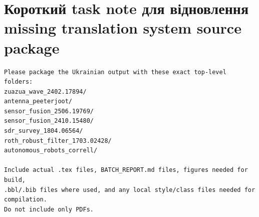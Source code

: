 \section{Короткий task note для відновлення missing translation system source package}

\begin{lstlisting}
Please package the Ukrainian output with these exact top-level folders:
zuazua_wave_2402.17894/
antenna_peeterjoot/
sensor_fusion_2506.19769/
sensor_fusion_2410.15480/
sdr_survey_1804.06564/
roth_robust_filter_1703.02428/
autonomous_robots_correll/

Include actual .tex files, BATCH_REPORT.md files, figures needed for build,
.bbl/.bib files where used, and any local style/class files needed for compilation.
Do not include only PDFs.
\end{lstlisting}
